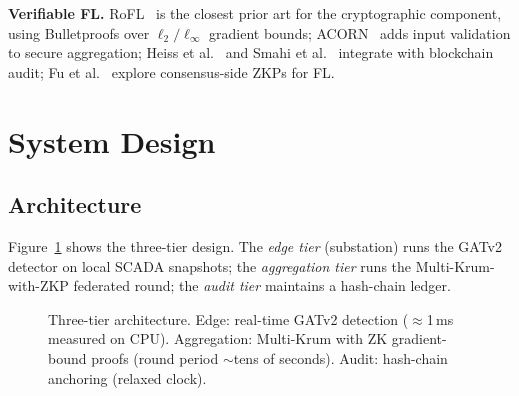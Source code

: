 \documentclass[conference]{IEEEtran}
\begin{document}
\textbf{Verifiable FL.} RoFL~\cite{lycklama2023rofl} is the closest prior art for the cryptographic component, using Bulletproofs over $\ell_2/\ell_\infty$ gradient bounds; ACORN~\cite{bell2023acorn} adds input validation to secure aggregation; Heiss et al.~\cite{heiss2022offchain} and Smahi et al.~\cite{smahi2024vflchain} integrate with blockchain audit; Fu et al.~\cite{fu2025zkpot} explore consensus-side ZKPs for FL.

\section{System Design}
\label{sec:design}
\subsection{Architecture}
Figure~\ref{fig:arch} shows the three-tier design. The \emph{edge tier} (substation) runs the GATv2 detector on local SCADA snapshots; the \emph{aggregation tier} runs the Multi-Krum-with-ZKP federated round; the \emph{audit tier} maintains a hash-chain ledger.

\begin{figure}[t]
\centering
{}
\caption{Three-tier architecture. Edge: real-time GATv2 detection ($\approx$1\,ms measured on CPU). Aggregation: Multi-Krum with ZK gradient-bound proofs (round period $\sim$tens of seconds). Audit: hash-chain anchoring (relaxed clock).}
\label{fig:arch}
\end{figure}
\end{document}
